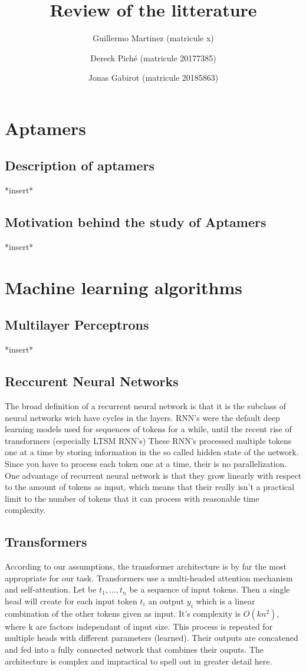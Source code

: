 \documentclass{article}
\title{Review of the litterature}
\author
{
    Guillermo Martinez (matricule x)
    \and
    Dereck Piché (matricule 20177385)
    \and
    Jonas Gabirot (matricule 20185863)
}
\begin{document}
\maketitle

\section*{Aptamers}
\subsection*{Description of aptamers}
*insert*
\subsection*{Motivation behind the study of Aptamers}
*insert*

\section*{Machine learning algorithms}
\subsection*{Multilayer Perceptrons}
*insert*
\subsection*{Reccurent Neural Networks}
The broad definition of a recurrent neural network 
is that it is the subclass of neural networks wich have cycles in the layers. 
RNN's were the default deep learning models used for sequences
of tokens for a while, until the recent rise of transformers (especially LTSM RNN's) 
These RNN's processed multiple tokens one at a time by storing information in the so called
hidden state of the network. Since you have to process each token one at 
a time, their is no parallelization. 
One advantage of recurrent neural network is that they grow 
linearly with respect to the amount of tokens as input, which means 
that their really isn't a practical limit to the number of tokens that
it can process with reasonable time complexity. 
\subsection*{Transformers}
According to our assumptions, the transformer 
architecture \cite{transformers} is by far the most appropriate
for our task. Transformers use a multi-headed 
attention mechanism and self-attention. Let
be $t_1, \dots, t_n$ be a sequence of input tokens. Then a single 
head will create for each input token $t_i$ an output $y_i$ which is a 
linear combination of the other tokens given as input. It's complexity
is $O(kn^2)$, where k are factors independant of input size. This process is 
repeated for multiple heads with different parameters (learned). Their
outputs are concatened and fed into a fully connected network that combines 
their ouputs. The architecture is complex and impractical to spell out
in greater detail here.
\end{document}
